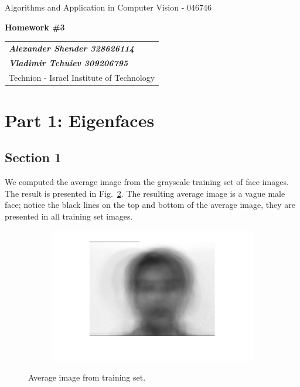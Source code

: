 \documentclass[a4paper]{iacas}
\begin{document}
\begin{center}
 \large Algorithms and Application in Computer Vision - 046746
 \end{center}
\begin{center}
\large\textbf{Homework \#3}
 \end{center}


\begin{tabular}{l}
\\
{\bf\textit{Alexander Shender 328626114}} \\
{\bf\textit{Vladimir Tchuiev 309206795}} \\
Technion - Israel Institute of Technology
\end{tabular}


\vspace{2em}

\section{Part 1: Eigenfaces}

\subsection{Section 1}

We computed the average image from the grayscale training set of face images. The result is presented in Fig.~\ref{fig:100}. The resulting average image is a vague male face; notice the black lines on the top and bottom of the average image, they are presented in all training set images.

\begin{figure}[!htbp]
	\centering
	\begin{subfigure}[b]{0.6\textwidth}
		\includegraphics[width=\textwidth]{101.jpg}
		\label{fig:101}
	\end{subfigure}

	\caption{Average image from training set.}
	\label{fig:100}
\end{figure}
\end{document}
